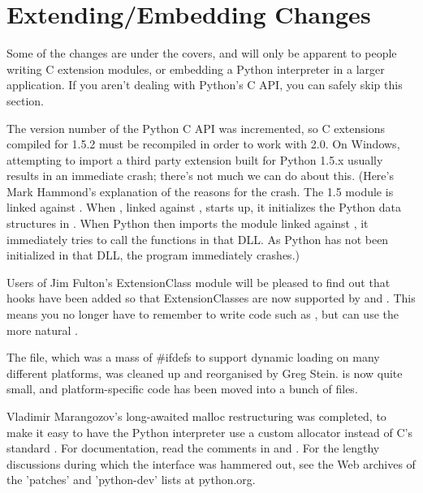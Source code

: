 \documentclass{howto}
\begin{document}
\section{Extending/Embedding Changes}

Some of the changes are under the covers, and will only be apparent to
people writing C extension modules, or embedding a Python interpreter
in a larger application.  If you aren't dealing with Python's C API,
you can safely skip this section.

The version number of the Python C API was incremented, so C
extensions compiled for 1.5.2 must be recompiled in order to work with
2.0.  On Windows, attempting to import a third party extension built
for Python 1.5.x usually results in an immediate crash; there's not
much we can do about this.  (Here's Mark Hammond's explanation of the
reasons for the crash.  The 1.5 module is linked against
.  When  , linked against
, starts up, it initializes the Python data
structures in .  When Python then imports the
module  linked against , it
immediately tries to call the functions in that DLL.  As Python has
not been initialized in that DLL, the program immediately crashes.)

Users of Jim Fulton's ExtensionClass module will be pleased to find
out that hooks have been added so that ExtensionClasses are now
supported by  and .
This means you no longer have to remember to write code such as
, but can use the more natural
.

The  file, which was a mass of \#ifdefs to
support dynamic loading on many different platforms, was cleaned up
and reorganised by Greg Stein.   is now quite small,
and platform-specific code has been moved into a bunch of
 files.  

Vladimir Marangozov's long-awaited malloc restructuring was completed,
to make it easy to have the Python interpreter use a custom allocator
instead of C's standard .  For documentation, read
the comments in  and
.  For the lengthy discussions during which
the interface was hammered out, see the Web archives of the 'patches'
and 'python-dev' lists at python.org.
\end{document}
